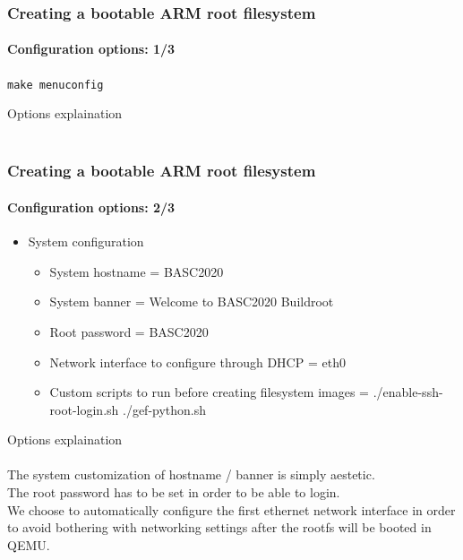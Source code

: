 \begin{frame}
  \frametitle{Creating a bootable ARM root filesystem}
  \framesubtitle{Configuration options: 1/3}
  \texttt{make menuconfig}
  \begin{itemize}
    \targetOptionsList
    \buildOptionsList
  \end{itemize}
\end{frame}
 {
  Options explaination \\
  \targetOptionsDescription \\
  \buildOptionsDescription
}

\begin{frame}
  \frametitle{Creating a bootable ARM root filesystem}
  \framesubtitle{Configuration options: 2/3}
  \begin{itemize}
    \toolchainOptionsList
    \item System configuration
    \begin{itemize}
      \item System hostname = BASC2020
      \item System banner = Welcome to BASC2020 Buildroot
      \item Root password = BASC2020
      \item Network interface to configure through DHCP = eth0
      \item Custom scripts to run before creating filesystem images = ./enable-ssh-root-login.sh ./gef-python.sh
    \end{itemize}
  \end{itemize}
\end{frame}
 {
  Options explaination \\
  \toolchainOptionsDescription \\
  The system customization of hostname / banner is simply aestetic. \\
  The root password has to be set in order to be able to login. \\
  We choose to automatically configure the first ethernet network interface in order to avoid bothering with networking settings after the rootfs will be booted in QEMU. \\
  \sshRootLoginDescription \\
  \gefPythonDescription
}

